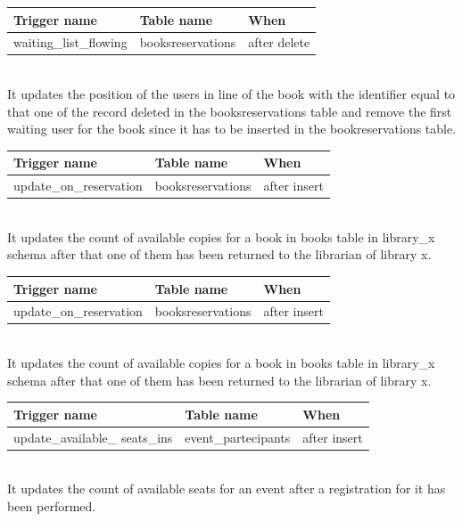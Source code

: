 \vspace{0.8cm}
\begin{tabular}[H]{p{4cm}|p{4cm}|p{4cm}}
	\textbf{Trigger name} & \textbf{Table name} & \textbf{When} \\
	\hline
	\rule{0pt}{4ex} waiting\_list\_flowing  & booksreservations & after delete \\
	\hline
\end{tabular}
 \vspace{0.8cm}\\
It updates the position of the users in line of the book with the identifier equal to that one of the record deleted in the booksreservations table and remove the first waiting user for the book since it has to be inserted in the bookreservations table.

\vspace{0.8cm}
\begin{tabular}[H]{p{4cm}|p{4cm}|p{4cm}}
	\textbf{Trigger name} & \textbf{Table name} & \textbf{When} \\
	\hline
	\rule{0pt}{4ex} update\_on\_reservation  & booksreservations & after insert \\
	\hline
\end{tabular}
\vspace{0.8cm}
\\

It updates the count of available copies for a book in books table in library\_x schema after that one of them has been returned to the librarian of library x.

\vspace{0.8cm}
\begin{tabular}[H]{p{4cm}|p{4cm}|p{4cm}}
	\textbf{Trigger name} & \textbf{Table name} & \textbf{When} \\
	\hline
	\rule{0pt}{4ex} update\_on\_reservation  & booksreservations & after insert \\
	\hline
\end{tabular}
\vspace{0.8cm}
\\
It updates the count of available copies for a book in books table in library\_x schema after that one of them has been returned to the librarian of library x.

\vspace{0.8cm}
\begin{tabular}[H]{p{4cm}|p{4cm}|p{4cm}}
	\textbf{Trigger name} & \textbf{Table name} & \textbf{When} \\
	\hline
	\rule{0pt}{4ex} update\_available\_
	seats\_ins  & event\_partecipants & after insert \\
	\hline
\end{tabular}
\vspace{0.8cm}
\\
It updates the count of available seats for an event after a registration for it has been performed.

